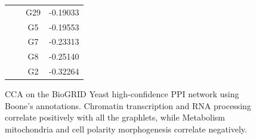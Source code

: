\begin{figure}[H]
\begin{tabular}{ c c | c c }
 & &  G29 & -0.19033\\
 & &  G5 & -0.19553\\
 & &  G7 & -0.23313\\
 & &  G8 & -0.25140\\
 & &  G2 & -0.32264\\
\end{tabular}
\caption[CCA on the BioGRID Yeast high-confidence PPI network -- Boone's annotations]{CCA on the BioGRID Yeast high-confidence PPI network using Boone's annotations. Chromatin transcription and RNA processing correlate positively with all the graphlets, while Metabolism mitochondria and cell polarity morphogenesis correlate negatively.}
\label{all_ppi11}
\end{figure}




